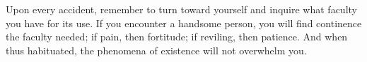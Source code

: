 Upon every accident, remember to turn toward yourself and inquire what
faculty you have for its use. If you encounter a handsome person, you
will find continence the faculty needed; if pain, then fortitude; if
reviling, then patience. And when thus habituated, the phenomena of
existence will not overwhelm you.
